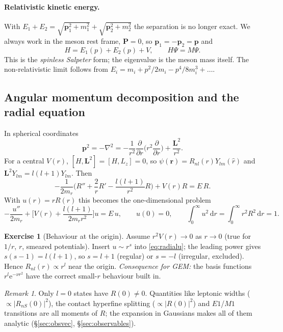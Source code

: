 \documentclass[11pt,a4paper]{article}
\numberwithin{equation}{section}
\theoremstyle{definition}
\newtheorem{exercise}[definition]{Exercise}
\theoremstyle{plain}
\theoremstyle{remark}
\newtheorem{remark}[definition]{Remark}
\numberwithin{algorithm}{section}
\newcommand{\vr}{\bm r}
\newcommand{\vp}{\bm p}
\newcommand{\vP}{\bm P}
\newcommand{\vL}{\bm L}
\newcommand{\dd}{\mathrm{d}}
\newcommand{\ee}{\mathrm{e}}
\newcommand{\mr}{m_r}
\begin{document}
\paragraph{Relativistic kinetic energy.} With $E_1+E_2=\sqrt{\vp_1^2+m_1^2}+\sqrt{\vp_2^2+m_2^2}$ the separation is no longer exact. We always work in the meson rest frame, $\vP=0$, so $\vp_1=-\vp_2=\vp$ and
\begin{equation}
H=E_1(p)+E_2(p)+V,\qquad H\Psi=M\Psi .
\end{equation}
This is the \emph{spinless Salpeter} form; the eigenvalue is the meson mass itself. The non-relativistic limit follows from $E_i=m_i+p^2/2m_i-p^4/8m_i^3+\dots$.

\subsection{Angular momentum decomposition and the radial equation}\label{sec:radial}
In spherical coordinates
\begin{equation}
\vp^2=-\nabla^2=-\frac1{r^2}\frac{\partial}{\partial r}\Big(r^2\frac{\partial}{\partial r}\Big)+\frac{\vL^2}{r^2}.
\end{equation}
For a central $V(r)$, $[H,\vL^2]=[H,L_z]=0$, so $\psi(\vr)=R_{nl}(r)Y_{lm}(\hat r)$ and $\vL^2Y_{lm}=l(l+1)Y_{lm}$. Then
\begin{equation}
-\frac{1}{2\mr}\Big(R''+\frac2rR'-\frac{l(l+1)}{r^2}R\Big)+V(r)R=E\,R .
\label{eq:radialR}
\end{equation}
With $u(r)=rR(r)$ this becomes the one-dimensional problem
\begin{equation}
-\frac{u''}{2\mr}+\Big[V(r)+\frac{l(l+1)}{2\mr r^2}\Big]u=E\,u,\qquad u(0)=0,\qquad \int_0^\infty u^2\,\dd r=\int_0^\infty r^2R^2\,\dd r=1 .
\label{eq:radialu}
\end{equation}

\begin{exercise}[Behaviour at the origin]
Assume $r^2V(r)\to0$ as $r\to0$ (true for $1/r$, $r$, smeared potentials). Insert $u\sim r^s$ into \eqref{eq:radialu}; the leading power gives $s(s-1)=l(l+1)$, so $s=l+1$ (regular) or $s=-l$ (irregular, excluded). Hence $R_{nl}(r)\propto r^l$ near the origin.
\emph{Consequence for GEM:} the basis functions $r^l\ee^{-\nu r^2}$ have the correct small-$r$ behaviour built in.
\end{exercise}

\begin{remark}
Only $l=0$ states have $R(0)\neq0$. Quantities like leptonic widths ($\propto|R_{nS}(0)|^2$), the contact hyperfine splitting ($\propto|R(0)|^2$) and $E1$/$M1$ transitions are all moments of $R$; the expansion in Gaussians makes all of them analytic (\S\ref{sec:obsvec}, \S\ref{sec:observables}).
\end{remark}
\end{document}
